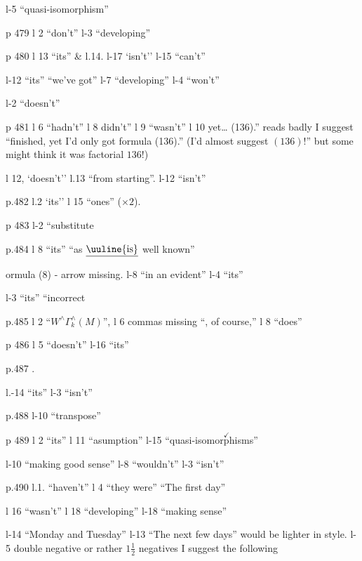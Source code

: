 l-5 ``quasi-isomorphism''

p 479 l 2 ``don't'' \quad l-3 ``developing''

p 480 l 13 ``its'' \& l.14. \quad l-17 `isn't'' \quad l-15 ``can't''

l-12 ``its'' ``we've got'' \quad l-7 ``developing'' \quad l-4 ``won't''

l-2 ``doesn't''

p 481 l 6 ``hadn't'' \quad l 8 didn't'' \quad l 9 ``wasn't'' \quad l 10 yet\ldots{} (136).'' reads badly I suggest ``finished, yet I'd only got  formula (136).'' (I'd almost suggest $(136)!$'' but some might think it was factorial $136!$)

l 12, `doesn't'' \quad l.13 ``from starting''. \quad l-12 ``isn't''

p.482 l.2 `its'' \quad l 15 ``ones'' ($\times 2$).


p 483 l-2 ``substitute

p.484 l 8 ``its'' \quad ``as $\underline{\text{\uuline{is}}}$ well known''

ormula (8) - arrow missing. \quad l-8 ``in an evident'' \quad l-4 ``its''

l-3 ``its'' \quad ``incorrect

p.485 l 2 ``$W^{\wedge}\Gamma_{k}^{\wedge}(M)$'', \quad l 6 commas missing ``, of course,'' \quad l 8 ``does''

p 486 l 5 ``doesn't'' \quad l-16 ``its''

p.487 .

l.-14 ``its'' \quad l-3 ``isn't''

p.488 l-10 ``transpose''

p 489 l 2 ``its'' \quad l 11 ``asumption'' \quad l-15 ``quasi-isomor$\overset{\checkmark}{\text{p}}$hisms''

l-10 ``making good sense'' \quad l-8 ``wouldn't'' \quad l-3 ``isn't''

p.490 l.1. ``haven't'' \quad l 4 ``they were'' \quad ``The first day''

l 16 ``wasn't'' \quad l 18 ``developing'' \quad l-18 ``making sense''

l-14 ``Monday and Tuesday'' \quad l-13 ``The next few days'' would be lighter in style. \quad l-5 double negative or rather $1\frac{1}{2}$ negatives I suggest the following

